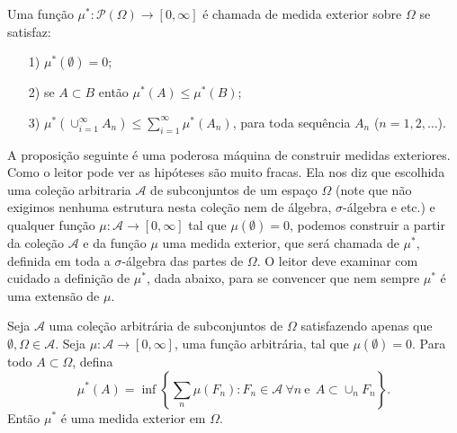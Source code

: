\begin{definicao}
\label{definicao-medida-exterior}
	Uma função $\mu^*:\mathcal{P}(\Omega)\to [0,\infty]$ é chamada de medida exterior 
	sobre $\Omega$ se satisfaz:
	\begin{itemize}
		\item[1)] $\mu^*(\emptyset)=0$;
		\item[2)] se $A\subset B$ então $\mu^*(A)\leq \mu^*(B)$;
		\item[3)] $\mu^{*}(\cup_{i=1}^{\infty} A_n) \leq \sum_{i=1}^{\infty} \mu^{*}(A_n)$, para toda
					sequência $A_n$ ($n=1,2,\ldots$).
	\end{itemize}
\end{definicao}






A proposição seguinte é uma poderosa máquina de construir medidas exteriores.
Como o leitor pode ver as hipóteses são muito fracas. Ela nos diz que
escolhida uma coleção arbitraria $\mathcal{A}$ de subconjuntos
de um espaço $\Omega$ 
(note que não exigimos nenhuma estrutura nesta coleção nem de álgebra, $\sigma$-álgebra e etc.)
e qualquer função $\mu:\mathcal{A}\to [0,\infty]$  
tal que $\mu(\emptyset)=0$, podemos construir a partir da coleção $\mathcal{A}$ e
da função $\mu$ uma medida exterior, que será chamada de $\mu^{*}$,
definida em toda a $\sigma$-álgebra das partes de $\Omega$.
O leitor deve examinar com cuidado a definição de
$\mu^{*}$, dada abaixo, para se convencer que nem sempre $\mu^{*}$ 
é uma extensão de $\mu$. 

 
\begin{proposicao}\label{prop-med-ext}
Seja $\mathcal{A}$ uma coleção arbitrária de subconjuntos de $\Omega$ satisfazendo
apenas que $\emptyset,\Omega\in \mathcal{A}$. Seja $\mu:\mathcal{A}\to [0,\infty]$,
uma função arbitrária, tal que $\mu(\emptyset)=0$.
Para todo $A\subset \Omega$, defina
\begin{equation}\label{def-medida-exterior}
\mu^{*}(A)= 
\inf \left\{
	\sum_{n}\mu(F_n): F_n\in \mathcal{A} \ \forall n\ \mathrm{e}
	\ \ A\subset \cup_{n} F_n
\right\}.
\end{equation}
Então $\mu^{*}$ é uma medida exterior em $\Omega$.
\end{proposicao}



